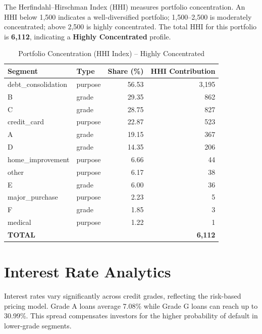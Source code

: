 \documentclass[11pt, a4paper]{article}
\begin{document}
The Herfindahl--Hirschman Index (HHI) measures portfolio concentration.  An HHI below
1,500 indicates a well-diversified portfolio; 1,500--2,500 is moderately concentrated;
above 2,500 is highly concentrated.  The total HHI for this portfolio is
\textbf{6,112}, indicating a \textbf{Highly Concentrated} profile.

\begin{table}[H]
\centering
\caption{Portfolio Concentration (HHI Index) -- Highly Concentrated}
\begin{tabular}{l l r r}
\toprule
\textbf{Segment} & \textbf{Type} & \textbf{Share (\%)} & \textbf{HHI Contribution} \\
\midrule
debt\_consolidation & purpose & 56.53 & 3,195 \\
B & grade & 29.35 & 862 \\
C & grade & 28.75 & 827 \\
credit\_card & purpose & 22.87 & 523 \\
A & grade & 19.15 & 367 \\
D & grade & 14.35 & 206 \\
home\_improvement & purpose & 6.66 & 44 \\
other & purpose & 6.17 & 38 \\
E & grade & 6.00 & 36 \\
major\_purchase & purpose & 2.23 & 5 \\
F & grade & 1.85 & 3 \\
medical & purpose & 1.22 & 1 \\
\textbf{TOTAL} &  &  & \textbf{6,112} \\
\bottomrule
\end{tabular}
\label{tab:concentration}
\end{table}

\section{Interest Rate Analytics}
\label{sec:rates}

Interest rates vary significantly across credit grades, reflecting the risk-based pricing
model.  Grade A loans average 7.08\% while Grade G loans can reach up to 30.99\%.  This spread compensates investors for the higher probability of default in
lower-grade segments.
\end{document}
